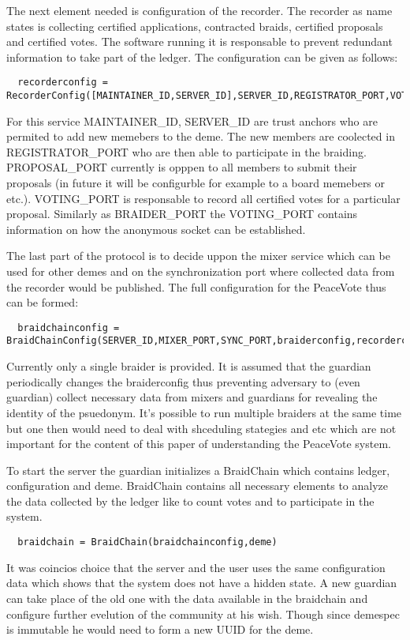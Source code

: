 \documentclass{article}
\begin{document}
The next element needed is configuration of the recorder. The recorder as name states is collecting certified applications, contracted braids, certified proposals and certified votes. The software running it is responsable to prevent redundant information to take part of the ledger. The configuration can be given as follows:
\begin{lstlisting}
  recorderconfig = RecorderConfig([MAINTAINER_ID,SERVER_ID],SERVER_ID,REGISTRATOR_PORT,VOTING_PORT,PROPOSAL_PORT)
\end{lstlisting}
For this service MAINTAINER\_ID, SERVER\_ID are trust anchors who are permited to add new memebers to the deme. The new members are coolected in REGISTRATOR\_PORT who are then able to participate in the braiding. PROPOSAL\_PORT currently is opppen to all members to submit their proposals (in future it will be configurble for example to a board memebers or etc.). VOTING\_PORT is responsable to record all certified votes for a particular proposal. Similarly as BRAIDER\_PORT the VOTING\_PORT contains information on how the anonymous socket can be established.

The last part of the protocol is to decide uppon the mixer service which can be used for other demes and on the synchronization port where collected data from the recorder would be published. The full configuration for the PeaceVote thus can be formed:
\begin{lstlisting}
  braidchainconfig = BraidChainConfig(SERVER_ID,MIXER_PORT,SYNC_PORT,braiderconfig,recorderconfig)
\end{lstlisting}
Currently only a single braider is provided. It is assumed that the guardian periodically changes the braiderconfig thus preventing adversary to (even guardian) collect necessary data from mixers and guardians for revealing the identity of the psuedonym. It's possible to run multiple braiders at the same time but one then would need to deal with shceduling stategies and etc which are not important for the content of this paper of understanding the PeaceVote system.

To start the server the guardian initializes a BraidChain which contains ledger, configuration and deme. BraidChain contains all necessary elements to analyze the data collected by the ledger like to count votes and to participate in the system.
\begin{lstlisting}
  braidchain = BraidChain(braidchainconfig,deme)
\end{lstlisting}
It was coincios choice that the server and the user uses the same configuration data which shows that the system does not have a hidden state. A new guardian can take place of the old one with the data available in the braidchain and configure further evelution of the community at his wish. Though since demespec is immutable he would need to form a new UUID for the deme.
\end{document}

